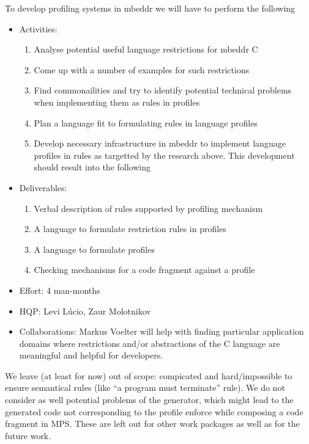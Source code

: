 To develop profiling systems in mbeddr we will have to perform the following
\begin{itemize}
  \item Activities:
  \begin{enumerate}
    \item Analyse potential useful language restrictions for mbeddr C
    \item Come up with a number of examples for such restrictions
    \item Find commonailities and try to identify potential technical problems
    when implementing them as rules in profiles
    \item Plan a language fit to formulating rules in language profiles
    \item Develop necessary infrastructure in mbeddr to implement language
    profiles in rules as targetted by the research above. This development
    should result into the following
  \end{enumerate}
  \item Deliverables:
  \begin{enumerate}
    \item Verbal description of rules supported by profiling mechanism
    \item A language to formulate restriction rules in profiles
    \item A language to formulate profiles
    \item Checking mechanisms for a code fragment against a profile
  \end{enumerate}
  \item Effort: 4 man-months
  \item HQP: Levi L\'ucio, Zaur Molotnikov
  \item Collaborations: Markus Voelter will help with finding
  particular application domains where restrictions and/or abstractions of the C
  language are meaningful and helpful for developers.
\end{itemize}

We leave (at least for now) out of scope: compicated and hard/impossible to
ensure semantical rules (like ``a program must terminate'' rule). We do not
consider as well potential problems of the generator, which might lead to the
generated code not corresponding to the profile enforce while composing a code
fragment in MPS. These are left out for other work packages as well as for the
future work.
